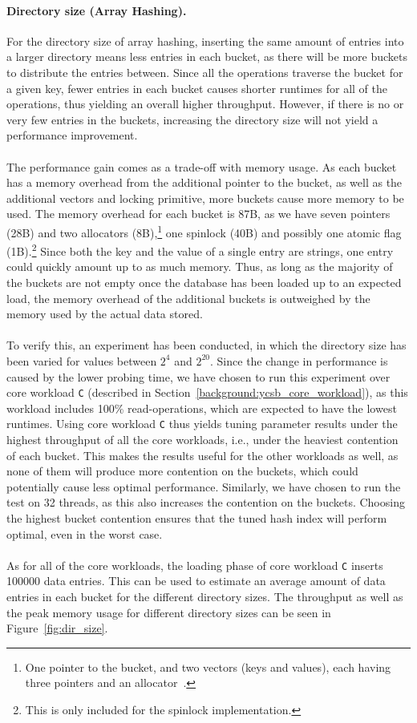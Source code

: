 \documentclass[11pt]{report} %
\begin{document}
\paragraph{Directory size (Array Hashing).} For the directory size of array hashing, inserting the same amount of entries into a larger directory means less entries in each bucket, as there will be more buckets to distribute the entries between. Since all the operations traverse the bucket for a given key, fewer entries in each bucket causes shorter runtimes for all of the operations, thus yielding an overall higher throughput. However, if there is no or very few entries in the buckets, increasing the directory size will not yield a performance improvement.\\
\\
The performance gain comes as a trade-off with memory usage. As each bucket has a memory overhead from the additional pointer to the bucket, as well as the additional vectors and locking primitive, more buckets cause more memory to be used. The memory overhead for each bucket is 87B, as we have seven pointers (28B) and two allocators (8B),\footnote{One pointer to the bucket, and two vectors (keys and values), each having three pointers and an allocator~\cite{vector}.} one spinlock (40B) and possibly one atomic flag (1B).\footnote{This is only included for the spinlock implementation.} Since both the key and the value of a single entry are strings, one entry could quickly amount up to as much memory. Thus, as long as the majority of the buckets are not empty once the database has been loaded up to an expected load, the memory overhead of the additional buckets is outweighed by the memory used by the actual data stored.\\
\\
To verify this, an experiment has been conducted, in which the directory size has been varied for values between $2^4$ and $2^{20}$. Since the change in performance is caused by the lower probing time, we have chosen to run this experiment over core workload \verb|C| (described in Section~\ref{background:ycsb_core_workload}), as this workload includes 100\% read-operations, which are expected to have the lowest runtimes. Using core workload \verb|C| thus yields tuning parameter results under the highest throughput of all the core workloads, i.e., under the heaviest contention of each bucket. This makes the results useful for the other workloads as well, as none of them will produce more contention on the buckets, which could potentially cause less optimal performance. Similarly, we have chosen to run the test on 32 threads, as this also increases the contention on the buckets. Choosing the highest bucket contention ensures that the tuned hash index will perform optimal, even in the worst case.\\
\\
As for all of the core workloads, the loading phase of core workload \verb|C| inserts 100000 data entries. This can be used to estimate an average amount of data entries in each bucket for the different directory sizes. The throughput as well as the peak memory usage for different directory sizes can be seen in Figure~\ref{fig:dir_size}.
\end{document}
